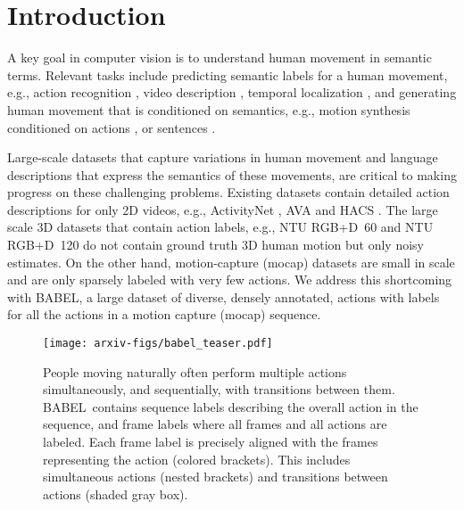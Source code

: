 \documentclass[final]{cvpr}
\def\babel{BABEL}
\def\ntu{NTU RGB+D}
\begin{document}
\section{Introduction}

A key goal in computer vision is to understand human movement in semantic terms. 
Relevant tasks include predicting semantic labels for a human movement, e.g., action recognition \cite{DBLP:journals/ivc/HerathHP17}, video description \cite{DBLP:conf/cvpr/XuMYR16}, temporal localization \cite{DBLP:conf/mir/SedmidubskyEZ19,DBLP:conf/iccv/Zhao0TY19}, 
and generating human movement that is conditioned on semantics, e.g., motion synthesis conditioned on actions \cite{DBLP:conf/mm/GuoZWZSDG020}, or sentences \cite{DBLP:conf/3dim/AhujaM19,lin20181}.

Large-scale datasets that capture variations in human movement and language descriptions that express the semantics of these movements, are critical to making progress on these challenging problems. 
Existing datasets contain detailed action descriptions for only 2D videos, e.g., ActivityNet \cite{DBLP:conf/mir/SedmidubskyEZ19}, AVA \cite{DBLP:conf/cvpr/GuSRVPLVTRSSM18} and HACS \cite{DBLP:conf/iccv/Zhao0TY19}. 
The large scale 3D datasets that contain action labels, e.g., \ntu~60 \cite{DBLP:conf/cvpr/ShahroudyLNW16} and \ntu~120 \cite{DBLP:journals/corr/abs-2004-14899} do not contain ground truth 3D human motion but only noisy estimates. 
On the other hand, motion-capture (mocap) datasets \cite{cmu_mocap,ghorbani2020movi,harvey2020robust,h36m_pami} are small in scale and are only sparsely labeled with very few actions. 
We address this shortcoming with \babel, a large dataset of diverse, densely annotated, actions with labels for all the actions  in a motion capture (mocap) sequence. 

\begin{figure}[t!]
    \centering
    \texttt{[image: arxiv-figs/babel\_teaser.pdf]}
    \caption{
        People moving naturally often perform multiple actions simultaneously, and sequentially, with transitions between them. 
    	\babel~contains sequence labels describing the overall action in the sequence, and frame labels where all frames and all actions are labeled. 
        Each frame label is precisely aligned with the frames representing the action (colored brackets). 
        This includes simultaneous actions (nested brackets) and transitions between actions (shaded gray box). 
	}
    \label{fig:teaser}
\end{figure}
\end{document}

